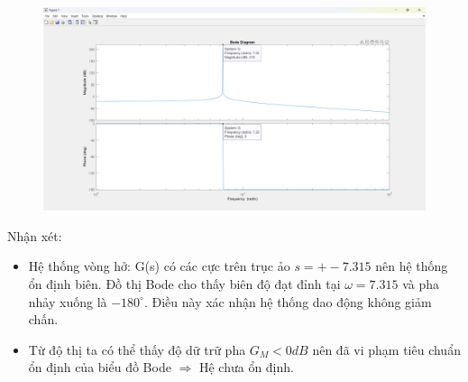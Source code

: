     \begin{figure}[H]
        \centering
        \includegraphics[width=1\textwidth]{pictures/bode.png}
    \end{figure}
    Nhận xét:
    \begin{itemize}
        \item Hệ thống vòng hở: G(s) có các cực trên trục ảo $s=+-7.315$ nên hệ thống ổn định biên. Đồ thị Bode cho thấy biên độ đạt đỉnh tại $\omega=7.315$ và pha nhảy xuống là $-180^\circ$. Điều này xác nhận hệ thống dao động không giảm chấn.
        \item Từ độ thị ta có thể thấy độ dữ trữ pha $G_M < 0 dB$ nên đã vi phạm tiêu chuẩn ổn định của biểu đồ Bode $\Rightarrow$ Hệ chưa ổn định. 
    \end{itemize}
